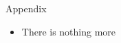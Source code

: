 \begin{frame}[label=details]{Appendix  \hyperlink{section-slide}{}}
    \begin{itemize}
        \item There is nothing more
    \end{itemize}
\end{frame}